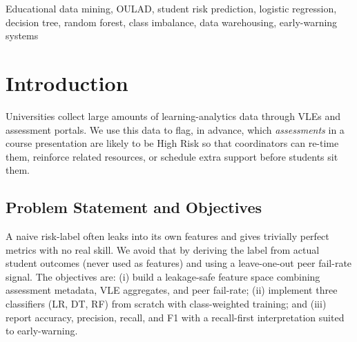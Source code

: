 \documentclass[conference]{IEEEtran}
\begin{document}
\begin{abstract}
We predict whether an OULAD course assessment will be \emph{High Risk} (at least $10\%$ of submitting students scoring below the pass mark of $40$) from $13$ features engineered over assessment metadata, VLE catalog aggregates, and a leakage-safe leave-one-out peer fail-rate. Three classifiers (Logistic Regression, Decision Tree, and Random Forest) are implemented from scratch in pure-stdlib Python and trained with class-weighted objectives on a stratified $80$/$20$ split of $188$ assessments. The Decision Tree is the strongest model ($97.30\%$ accuracy, $80.00\%$ precision, $100.00\%$ recall, $88.89\%$ F1), Random Forest follows ($94.59\%$ / $75.00\%$ / $75.00\%$ / $75.00\%$), and Logistic Regression matches recall at lower precision ($78.38\%$ / $33.33\%$ / $100.00\%$ / $50.00\%$). All three models agree that \emph{peer\_fail\_rate} is the dominant signal, and the recall-first behaviour suits an early-warning use case.
\end{abstract}

\begin{IEEEkeywords}
Educational data mining, OULAD, student risk prediction, logistic regression, decision tree, random forest, class imbalance, data warehousing, early-warning systems
\end{IEEEkeywords}

\section{Introduction}
Universities collect large amounts of learning-analytics data through VLEs and assessment portals. We use this data to flag, in advance, which \emph{assessments} in a course presentation are likely to be High Risk so that coordinators can re-time them, reinforce related resources, or schedule extra support before students sit them.

\subsection{Problem Statement and Objectives}
A naive risk-label often leaks into its own features and gives trivially perfect metrics with no real skill. We avoid that by deriving the label from actual student outcomes (never used as features) and using a leave-one-out peer fail-rate signal. The objectives are: (i) build a leakage-safe feature space combining assessment metadata, VLE aggregates, and peer fail-rate; (ii) implement three classifiers (LR, DT, RF) from scratch with class-weighted training; and (iii) report accuracy, precision, recall, and F1 with a recall-first interpretation suited to early-warning.
\end{document}
